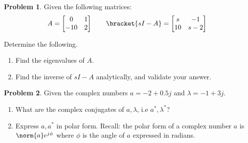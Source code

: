 \documentclass[10pt]{article}
\theoremstyle{definition}
\newtheorem{prob}{Problem}[section]
\newenvironment{subprob}%
{\renewcommand{\theenumi}{\alph{enumi}}\renewcommand{\labelenumi}{(\theenumi)}\begin{enumerate}}%
{\end{enumerate}}%
\begin{document}
\begin{prob}
    Given the following matrices:
        \begin{align*}
            A = \begin{bmatrix} 0 & 1 \\ -10 & 2\end{bmatrix} \qquad 
            \bracket{sI-A} = \begin{bmatrix} s & -1 \\ 10 & s- 2 \end{bmatrix}
        \end{align*}

    Determine the following.
    \begin{subprob}
    \item Find the eigenvalues of \( A\).
    \item Find the inverse of \( sI -A \) analytically, and validate your answer.
    \end{subprob}
\end{prob}

\clearpage\newpage

\begin{prob}
    Given the complex numbers \( a = -2 + 0.5 j \) and \( \lambda = -1 + 3 j\).

    \begin{subprob}
    \item What are the complex conjugates of \( a, \lambda\), i.e \( a^*, \lambda^*\)?
    \item Express \( a, a^*\) in polar form.
        Recall: the polar form of a complex number \( a \) is \( \norm{a} e^{j \phi} \) where \( \phi\) is the angle of \( a \) expressed in radians.
    \end{subprob}
\end{prob}
\end{document}
